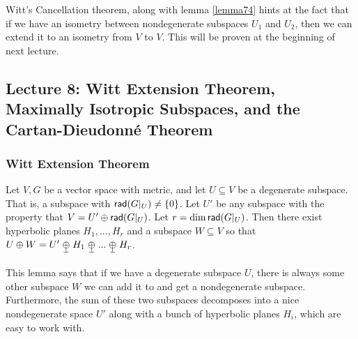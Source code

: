 \begin{remark*}
    Witt's Cancellation theorem, along with lemma \ref{lemma74} hints at the fact that if we have an isometry between nondegenerate subspaces $U_1$ and $U_2$, then we can extend it to an isometry from $V$ to $V$. This will be proven at the beginning of next lecture.
\end{remark*}
\subsection{Lecture 8: Witt Extension Theorem, Maximally Isotropic Subspaces, and the Cartan-Dieudonn\'e Theorem}
\subsubsection{Witt Extension Theorem}
\begin{lemma}
    Let $V,G$ be a vector space with metric, and let $U\subseteq V$ be a degenerate subspace. That is, a subspace with $\operatorname{\textsf{rad}} (G|_U) \neq \{0\}$. Let $U'$ be any subspace with the property that $V=U' \oplus \operatorname{\textsf{rad}}(G|_U)$. Let $r = \dim \operatorname{\textsf{rad}}(G|_U)$. Then there exist hyperbolic planes $H_1,...,H_r$ and a subspace $W \subseteq V$ so that $U\oplus W = U'\orthoplus H_1\orthoplus ...\orthoplus H_r$.
\end{lemma}
\begin{remark*}
    This lemma says that if we have a degenerate subspace $U$, there is always some other subspace $W$ we can add it to and get a nondegenerate subspace. Furthermore, the sum of these two subspaces decomposes into a nice nondegenerate space $U'$ along with a bunch of hyperbolic planes $H_i$, which are easy to work with.
\end{remark*}
